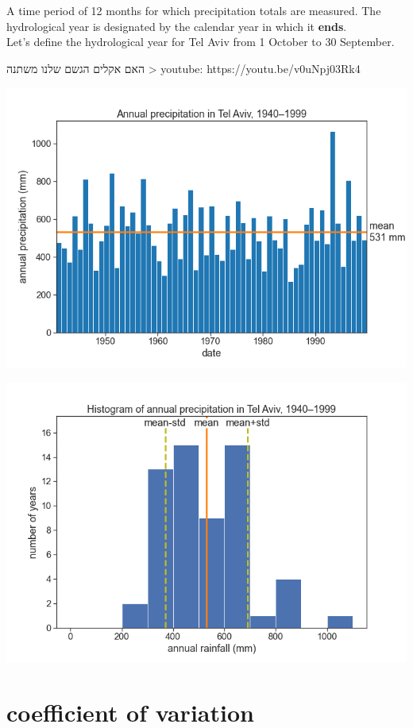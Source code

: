 \documentclass[
  letterpaper,
  DIV=11,
  numbers=noendperiod]{scrreprt}
\begin{document}
A time period of 12 months for which precipitation totals are measured.
The hydrological year is designated by the calendar year in which it
\textbf{ends}.\\
Let's define the hydrological year for Tel Aviv from 1 October to 30
September.

האם אקלים הגשם שלנו משתנה \textgreater{} youtube:
https://youtu.be/v0uNpj03Rk4

\includegraphics{archive/figures/annual_tel_aviv_with_mean.png}

\includegraphics{archive/figures/histogram_tel_aviv_with_mean_and_std.png}

\hypertarget{coefficient-of-variation}{%
\section{coefficient of variation}\label{coefficient-of-variation}}
\end{document}

